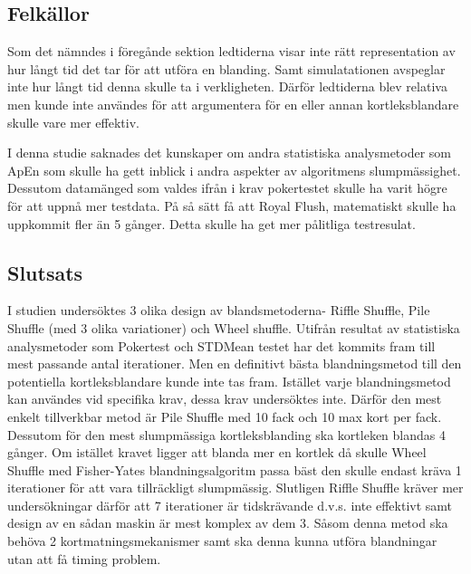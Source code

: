 \documentclass[swedish,a4paper]{article}
\begin{document}
\subsection{Felkällor}
\label{sec:d_fk}
Som det nämndes i föregånde sektion ledtiderna visar inte rätt representation av
hur långt tid det tar för att utföra en blanding. Samt simulatationen avspeglar
inte hur långt tid denna skulle ta i verkligheten. Därför ledtiderna blev
relativa men kunde inte användes för att argumentera för en eller annan
kortleksblandare skulle vare mer effektiv.

I denna studie saknades det kunskaper om andra statistiska analysmetoder som
ApEn som skulle ha gett inblick i andra aspekter av algoritmens slumpmässighet.
Dessutom datamänged som valdes ifrån i krav pokertestet skulle ha varit högre
för att uppnå mer testdata. På så sätt få att Royal Flush, matematiskt skulle ha
uppkommit fler än 5 gånger. Detta skulle ha get mer pålitliga testresulat.



\subsection{Slutsats}
\label{sec:d_s}
I studien undersöktes 3 olika design av blandsmetoderna- Riffle Shuffle, Pile
Shuffle (med 3 olika variationer) och Wheel shuffle. Utifrån resultat av
statistiska analysmetoder som Pokertest och STDMean testet har det kommits fram
till mest passande antal iterationer. Men en definitivt bästa blandningsmetod
till den potentiella kortleksblandare kunde inte tas fram. Istället varje
blandningsmetod kan användes vid specifika krav, dessa krav undersöktes inte.
Därför den mest enkelt tillverkbar metod är Pile Shuffle med 10 fack och 10 max
kort per fack. Dessutom för den mest slumpmässiga kortleksblanding ska
kortleken blandas 4 gånger. Om istället kravet ligger att blanda mer en
kortlek då skulle Wheel Shuffle med Fisher-Yates blandningsalgoritm passa bäst
den skulle endast kräva 1 iterationer för att vara tillräckligt slumpmässig.
Slutligen Riffle Shuffle kräver mer undersökningar därför att 7 iterationer är
tidskrävande d.v.s. inte effektivt samt design av en sådan maskin är mest komplex
av dem 3. Såsom denna metod ska behöva 2 kortmatningsmekanismer samt ska denna
kunna utföra blandningar utan att få timing problem.
\end{document}
